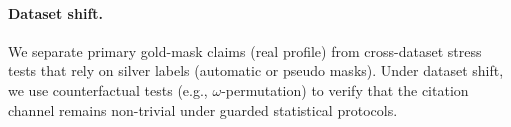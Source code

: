 \paragraph{Dataset shift.}
We separate primary gold-mask claims (real profile) from cross-dataset stress tests that rely on silver labels (automatic or pseudo masks).
Under dataset shift, we use counterfactual tests (e.g., $\omega$-permutation) to verify that the citation channel remains non-trivial under guarded statistical protocols.
